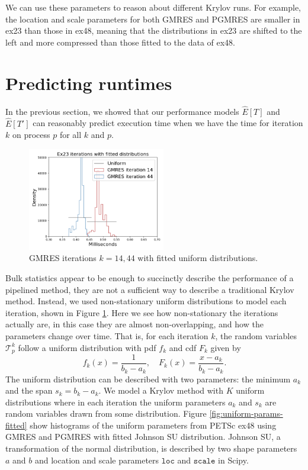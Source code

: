 \documentclass[num-refs]{wiley-article}
\begin{document}
We can use these parameters to reason about different Krylov runs.
For example, the location and scale parameters for both GMRES and PGMRES are smaller in ex23 than those in ex48, meaning that the distributions in ex23 are shifted to the left and more compressed than those fitted to the data of ex48.
\fi


\section{Predicting runtimes}\label{sec:performance-estimates}

In the previous section, we showed that our performance models $\widehat{E}[T]$ and $\widehat{E}[T']$ can reasonably predict execution time when we have the time for iteration $k$ on process $p$ for all $k$ and $p$. 

\begin{figure}[b]
\centering
\includegraphics[width=6cm]{../plots/GMRES_ex23_8192_1000000__stationary_in_t_with_uniform_14_44.png}
\caption{GMRES  iterations $k = 14, 44$ with fitted uniform distributions.} \label{fig:iterations-with-fitted-uniform}
\end{figure}

Bulk statistics appear to be enough to succinctly describe the performance of a pipelined method, they are not a sufficient way to describe a traditional Krylov method. Instead, we used non-stationary uniform distributions to model each iteration, shown in Figure \ref{fig:iterations-with-fitted-uniform}.
Here we see how non-stationary the iterations actually are, in this case they are almost non-overlapping, and how the parameters change over time. 
That is, for each iteration $k$, the random variables $\mathcal{T}_p^k$ follow a uniform distribution with pdf $f_k$ and cdf $F_k$ given by
\begin{equation} \label{eq:uniform}
f_k(x) = \frac{1}{b_k - a_k}, \quad F_k(x) = \frac{x-a_k}{b_k-a_k}.
\end{equation}
The uniform distribution can be described with two parameters: the minimum $a_k$ and the span $s_k = b_k - a_k$. We model a Krylov method with $K$ uniform distributions
where in each iteration the uniform parameters $a_k$ and $s_k$ are random variables drawn from some distribution. 
Figure \ref{fig:uniform-params-fitted} show histograms of the uniform parameters from  PETSc ex48 using GMRES and PGMRES with fitted Johnson SU distribution.
Johnson SU, a transformation of the normal distribution, is described by two shape parameters $a$ and $b$ and location and scale parameters ${\texttt{loc}}$ and ${\texttt{scale}}$ in Scipy.  
\end{document}
